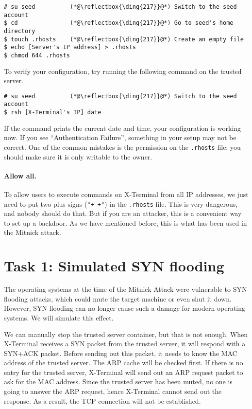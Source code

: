 \begin{lstlisting}
# su seed          (*@\reflectbox{\ding{217}}@*) Switch to the seed account
$ cd               (*@\reflectbox{\ding{217}}@*) Go to seed's home directory
$ touch .rhosts    (*@\reflectbox{\ding{217}}@*) Create an empty file 
$ echo [Server's IP address] > .rhosts
$ chmod 644 .rhosts
\end{lstlisting}

To verify your configuration, try running the following command on the trusted server.
\begin{lstlisting}
# su seed          (*@\reflectbox{\ding{217}}@*) Switch to the seed account
$ rsh [X-Terminal's IP] date
\end{lstlisting}

If the command prints the current date and time, your configuration is working now. If you
see ``Authentication Failure'', something in your setup may not be correct. 
One of the common mistakes is the permission on the \texttt{.rhosts} file:
you should make sure it is only writable to the owner.


\paragraph{Allow all.} To allow users to execute commands on X-Terminal from 
all IP addresses, we just need to put two plus signs (\texttt{"+ +"})
in the \texttt{.rhosts} file. This is very dangerous, and nobody should 
do that. But if you are an attacker, this is a convenient way
to set up a backdoor. As we have mentioned before, this is what has been used in
the Mitnick attack. 



\section{Task 1: Simulated SYN flooding}

The operating systems at the time of the Mitnick Attack were vulnerable to SYN
flooding attacks, which could mute the target machine or even shut it down. 
However, SYN flooding can no longer cause such a damage for modern operating systems. 
We will simulate this effect. 

We can manually stop the trusted server container, but that is not enough.
When X-Terminal receives a SYN packet from the trusted server, it will respond with
a SYN+ACK packet. Before sending out this packet, 
it needs to know the MAC address of the trusted server. 
The ARP cache will be checked first. If there is no entry
for the trusted server, X-Terminal will send out an ARP request packet 
to ask for the MAC address. Since the trusted server has been
muted, no one is going to answer the ARP request, hence 
X-Terminal cannot send out the response. As a result, the
TCP connection will not be established. 

